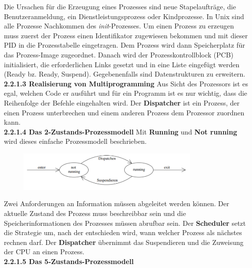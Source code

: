 \documentclass{article}
\begin{document}
    Die Ursachen für die Erzeugung eines Prozesses sind neue Stapelaufträge, die Benutzeranmeldung, ein Dienstleistungsprozess oder Kindprozesse.\newline
    In Unix sind alle Prozesse Nachkommen des \textit{init}-Prozesses.\newline
    Um einen Prozess zu erzeugen muss zuerst der Prozess einen Identifikator zugewiesen bekommen und mit dieser PID in die Prozesstabelle eingetragen. Dem Prozess wird dann Speicherplatz für das Prozess-Image zugeordnet. Danach wird der Prozesskontrollblock (PCB) initialisiert, die erforderlichen Links gesetzt und in eine Liste eingefügt werden (Ready bz. Ready, Suspend). Gegebenenfalls sind Datenstrukturen zu erweitern.\newline
    \\
    \textbf{2.2.1.3 Realisierung von Multiprogramming}\newline
    Aus Sicht des Prozessors ist es egal, welchen Code er ausführt und für ein Programm ist es nur wichtig, dass die Reihenfolge der Befehle eingehalten wird. Der \textbf{Dispatcher} ist ein Prozess, der einen Prozess unterbrechen und einem anderen Prozess dem Prozessor zuordnen kann.\newline
    \\
    \textbf{2.2.1.4 Das 2-Zustands-Prozessmodell}\newline
    Mit \textbf{Running} und \textbf{Not running} wird dieses einfache Prozessmodell beschrieben.
    \begin{figure}[h]
        \centering
	    \includegraphics[width=90mm]{Skizzen/2_Kapitel/2-Zustandsmodell.png}
    \end{figure}
    Zwei Anforderungen an Information müssen abgeleitet werden können. Der aktuelle Zustand des Prozess muss beschreibbar sein und die Speicherinformationen des Prozesses müssen abrufbar sein.\newline
    Der \textbf{Scheduler} setzt die Strategie um, nach der entschieden wird, wann welcher Prozess als nächstes rechnen darf. Der \textbf{Dispatcher} übernimmt das Suspendieren und die Zuweisung der CPU an einen Prozess.\newline
    \\
    \textbf{2.2.1.5 Das 5-Zustands-Prozessmodell}\newline
\end{document}
